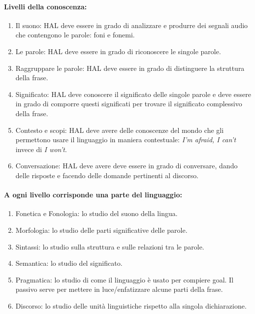 \paragraph{Livelli della conoscenza:}

\begin{enumerate}
  \item Il suono: HAL deve essere in grado di analizzare e produrre
dei segnali audio che contengono le parole: foni e
fonemi. 
\item Le parole: HAL deve essere in grado di riconoscere le singole
parole. 
\item Raggruppare le parole: HAL deve essere in grado di distinguere la struttura
della frase. 
\item Significato: HAL deve conoscere il significato delle singole
parole e deve essere in grado di comporre questi
significati per trovare il significato complessivo
della frase. 
\item Contesto e scopi: HAL deve avere delle conoscenze del mondo che
gli permettono usare il linguaggio in maniera
contestuale: \textit{I’m afraid, I can’t} invece di \textit{I won't}.
\item Conversazione: HAL deve avere deve essere in grado di
conversare, dando delle risposte e facendo delle
domande pertinenti al discorso. 
\end{enumerate}

\paragraph{A ogni livello corrisponde una parte del linguaggio:}

\begin{enumerate}
  \item Fonetica e Fonologia: lo studio del suono della lingua. 
  \item Morfologia: lo studio delle parti significative delle parole. 
  \item Sintassi: lo studio sulla struttura e sulle relazioni tra le parole. 
  \item Semantica: lo studio del significato. 
  \item Pragmatica: lo studio di come il linguaggio è usato per compiere goal. Il passivo serve per mettere in luce/enfatizzare alcune parti della frase. 
  \item Discorso: lo studio delle unità linguistiche rispetto alla singola dichiarazione.
\end{enumerate}
















